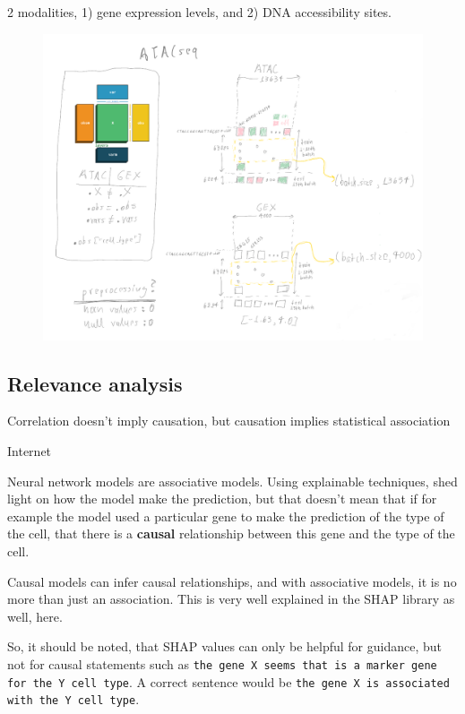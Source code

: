 \documentclass[12pt, a4paper]{article}
\begin{document}
2 modalities, 1) gene expression levels, and 2) DNA accessibility sites.


\begin{figure}[h!]
  \centering
  \includegraphics[width=\textwidth]{atac.png}
  \caption{}
\end{figure}



\subsection{Relevance analysis}
\label{sec:relevance}


\epigraph{Correlation doesn't imply causation, but causation implies statistical association}{Internet}

Neural network models are associative models. Using explainable techniques, shed light on how the model make the prediction, but that doesn't mean that if for example the model used a particular gene to make the prediction of the type of the cell, that there is a \textbf{causal} relationship between this gene and the type of the cell. 

Causal models can infer causal relationships, and with associative models, it is no more than just an association. This is very well explained in the SHAP library as well, here.

So, it should be noted, that SHAP values can only be helpful for guidance, but not for causal statements such as \verb|the gene X seems that is a marker gene for the Y cell type|. A correct sentence would be \verb|the gene X is associated with the Y cell type|.
\end{document}
